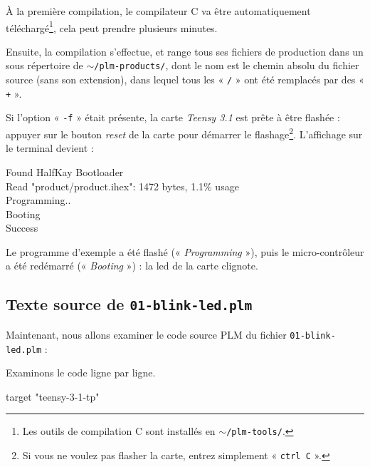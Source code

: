À la première compilation, le compilateur C va être automatiquement téléchargé\footnote{Les outils de compilation C sont installés en \texttt{$\sim$/plm-tools/}.}, cela peut prendre plusieurs minutes.

Ensuite, la compilation s'effectue, et range tous ses fichiers de production dans un sous répertoire de \texttt{$\sim$/plm-products/}, dont le nom est le  chemin absolu du fichier source (sans son extension), dans lequel tous les « \texttt{/} » ont été remplacés par des « \texttt{+} ».

Si l'option « \texttt{-f} » était présente, la carte \emph{Teensy 3.1} est prête à être flashée : appuyer sur le bouton \emph{reset} de la carte pour démarrer le flashage\footnote{Si vous ne voulez pas flasher la carte, entrez simplement « \texttt{ctrl~C} ».}. L'affichage sur le terminal devient :
\begin{SHELL}
Found HalfKay Bootloader\\
Read "product/product.ihex": 1472 bytes, 1.1\% usage\\
Programming..\\
Booting\\
Success
\end{SHELL}

Le programme d'exemple a été flashé (« \emph{Programming} »), puis le micro-contrôleur a été redémarré (« \emph{Booting} ») : la led de la carte clignote.

\subsection{Texte source de \texttt{01-blink-led.plm}}

Maintenant, nous allons examiner le code source PLM du fichier \texttt{01-blink-led.plm} :


Examinons le code ligne par ligne.

\begin{PLM}[1]
target "teensy-3-1-tp"
\end{PLM}

